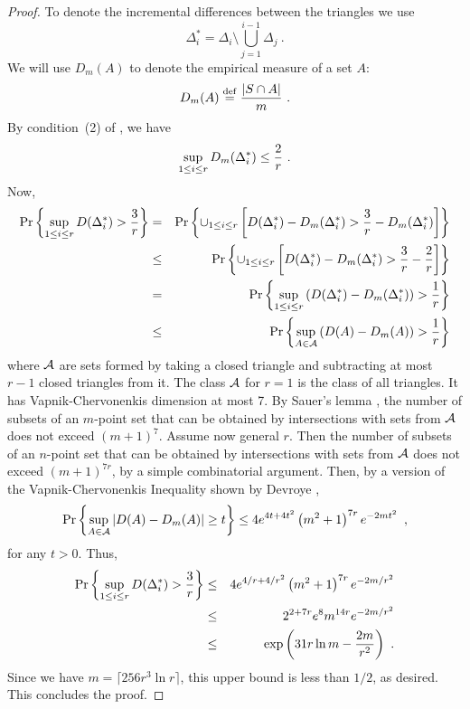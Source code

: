 \documentclass{patmorin}
\begin{document}
\begin{proof}
To denote the incremental differences between the triangles we use
\[
  \Delta_i^* = \Delta_i \setminus \bigcup_{j=1}^{i-1} \Delta_j ~.
\]
We will
use $D_m(A)$ to denote the empirical measure of a set $A$:
\[
  D_m (A) \isdef {{|S\cap A|} \over m}
~.
\]  
By condition~(2) of ,
we have
\[
  \sup_{1 \le i \le r} D_m(\Delta_i^*) \le { 2 \over r }~.
\]
Now,
\begin{eqnarray*}
\Pr \left\{ \sup_{1 \le i \le r} D ( \Delta^*_i ) > {3 \over r} \right\}
&=& \Pr \left\{ \cup_{1 \le i \le r} \left[ D ( \Delta^*_i ) - D_m(\Delta_i^*)  >  {3 \over r} - D_m(\Delta_i^*) \right] \right\} \\
&\le& \Pr \left\{ \cup_{1 \le i \le r} \left[ D ( \Delta^*_i ) - D_m(\Delta_i^*)  > {3 \over r} - {2 \over r}  \right] \right\} \\
&=& \Pr \left\{ \sup_{1 \le i \le r} \left(  D ( \Delta^*_i ) - D_m(\Delta_i^*) \right) > {1 \over r} \right\} \\
&\le& \Pr \left\{ \sup_{A \in {\cal A}} \left( D ( A ) - D_m ( A ) \right)  > {1 \over r} \right\} \\
\end{eqnarray*}
where $\cal A$ are sets formed by taking a closed triangle and subtracting
at most $r-1$  closed triangles from it.
The class $\cal A$ for $r=1$ is the class of all triangles.
It has Vapnik-Chervonenkis dimension at most 7. 
By Sauer's  lemma 
\cite{s72}\cite[Pages~28--29]{dl01},
the number of subsets of an $m$-point set that can be obtained by intersections
with sets from $\cal A$ does not exceed $(m+1)^7$.
Assume now general $r$. Then the number of subsets of an $n$-point set that can be obtained by intersections
with sets from $\cal A$ does not exceed $(m+1)^{7r}$,
by a simple combinatorial argument.
Then, by a version of the Vapnik-Chervonenkis Inequality 
\cite{vc71} shown by Devroye \cite{d82},
\[
\Pr \left\{ \sup_{A \in {\cal A}} \left| D ( A ) - D_m ( A ) \right|  \ge t \right\}
\le 4 e^{4t+4t^2} \left( m^2 + 1 \right)^{7r}  e^{-2mt^2} \enspace , 
\]
for any $t > 0$.  Thus, 
\begin{eqnarray*}
\Pr \left\{ \sup_{1 \le i \le r} D ( \Delta^*_i )  > {3 \over r} \right\}
&\le& 4 e^{4/r + 4/r^2} \left( m^2 + 1 \right)^{7r}  e^{-2m/r^2} \\
&\le& 2^{2+7r}  e^{8}  m^{14r}  e^{-2m/r^2} \\
&\le& \exp \left( 31r\ln m - \frac{2m}{r^2} \right)  ~.
\end{eqnarray*}
Since we have $m=\lceil 256r^3\ln r \rceil$, this upper bound is less than $1/2$, as desired.  This concludes the proof.
\end{proof}
\end{document}
